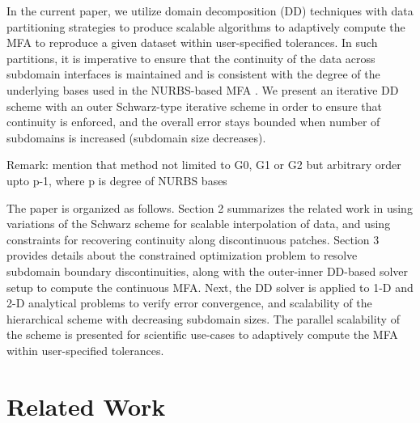 \documentclass[conference]{IEEEtran}
\newcommand{\Remark}[1]{{\color{RED}\sf Remark: {#1}}}
\begin{document}
In the current paper, we utilize domain decomposition (DD) techniques \cite{smith-ddm} with data partitioning strategies to produce scalable algorithms to adaptively compute the MFA to reproduce a given dataset within user-specified tolerances. In such partitions, it is imperative to ensure that the continuity of the data across subdomain interfaces is maintained and is consistent with the degree of the underlying bases used in the NURBS-based MFA \cite{peterka-mfa}. 
We present an iterative DD scheme with an outer Schwarz-type iterative scheme in order to ensure that continuity is enforced, and the overall error stays bounded when number of subdomains is increased (subdomain size decreases).

\Remark{mention that method not limited to G0, G1 or G2 but arbitrary order upto p-1, where p is degree of NURBS bases}


The paper is organized as follows. Section 2 summarizes the related work in using variations of the Schwarz scheme for scalable interpolation of data, and using constraints for recovering continuity along discontinuous patches. Section 3 provides details about the constrained optimization problem to resolve subdomain boundary discontinuities, along with the outer-inner DD-based solver setup to compute the continuous MFA. Next, the DD solver is applied to 1-D and 2-D analytical problems to verify error convergence, and scalability of the hierarchical scheme with decreasing subdomain sizes. The parallel scalability of the scheme is presented for scientific use-cases to adaptively compute the MFA within user-specified tolerances.


\section{Related Work}
\end{document}
